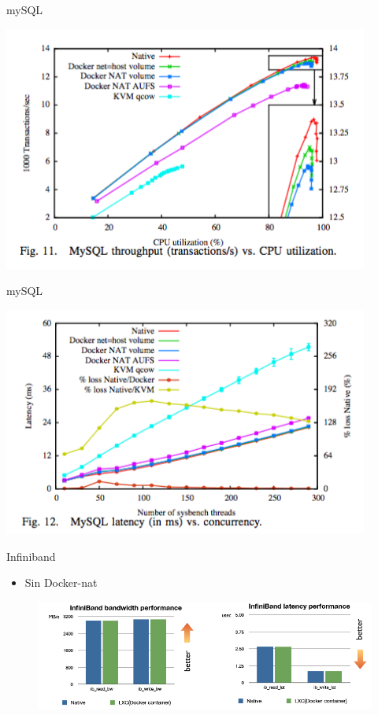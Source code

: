 \documentclass[compress]{beamer}
\begin{document}
\begin{frame}{mySQL}

  \includegraphics[width=0.9\textwidth]{images/mysql1}
\end{frame}
\begin{frame}{mySQL}

  \includegraphics[width=0.9\textwidth]{images/mysql2}
\end{frame}



\begin{frame}{Infiniband}
	\begin{itemize}
		\item  Sin Docker-nat
	\end{itemize}
\begin{figure}[H]
  \centering
  \includegraphics[width=1\textwidth]{images/infiniband.png}
    \label{fig:dynamic}
\end{figure}	
\end{frame}
\end{document}
